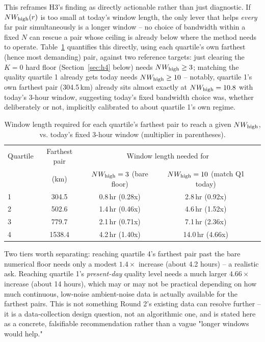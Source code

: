 \documentclass[11pt]{article}
\begin{document}
This reframes H3's finding as directly actionable rather than just diagnostic. If $NW_{\rm
high}(r)$ is too small at today's window length, the only lever that helps \emph{every} far pair
simultaneously is a longer window -- no choice of bandwidth within a fixed $N$ can rescue a pair
whose ceiling is already below where the method needs to operate. Table~\ref{tab:window-fix}
quantifies this directly, using each quartile's own farthest (hence most demanding) pair, against
two reference targets: just clearing the $K=0$ hard floor (Section~\ref{sec:h4} below) needs
$NW_{\rm high}\geq 3$; matching the quality quartile 1 already gets today needs $NW_{\rm
high}\geq 10$ -- notably, quartile 1's own farthest pair (304.5\,km) already sits almost exactly
at $NW_{\rm high}=10.8$ with today's 3-hour window, suggesting today's fixed bandwidth choice was,
whether deliberately or not, implicitly calibrated to about quartile 1's own regime.

\begin{table}[h]
\centering
\begin{tabular}{lcccc}
\toprule
Quartile & Farthest pair & \multicolumn{2}{c}{Window length needed for} \\
& (km) & $NW_{\rm high}=3$ (bare floor) & $NW_{\rm high}=10$ (match Q1 today) \\
\midrule
1 & 304.5  & 0.8\,hr (0.28x) & 2.8\,hr (0.92x) \\
2 & 502.6  & 1.4\,hr (0.46x) & 4.6\,hr (1.52x) \\
3 & 779.7  & 2.1\,hr (0.71x) & 7.1\,hr (2.36x) \\
4 & 1538.4 & 4.2\,hr (1.40x) & 14.0\,hr (4.66x) \\
\bottomrule
\end{tabular}
\caption{Window length required for each quartile's farthest pair to reach a given $NW_{\rm
high}$, vs. today's fixed 3-hour window (multiplier in parentheses).}
\label{tab:window-fix}
\end{table}

Two tiers worth separating: reaching quartile 4's farthest pair past the bare numerical floor
needs only a modest $1.4\times$ increase (about 4.2 hours) -- a realistic ask. Reaching quartile
1's \emph{present-day} quality level needs a much larger $4.66\times$ increase (about 14 hours),
which may or may not be practical depending on how much continuous, low-noise ambient-noise data
is actually available for the farthest pairs. This is not something Round 2's existing data can
resolve further -- it is a data-collection design question, not an algorithmic one, and is stated
here as a concrete, falsifiable recommendation rather than a vague "longer windows would help."
\end{document}
